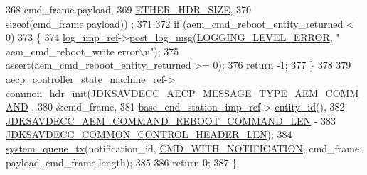 \begin{DoxyCode}
368                                                                                  cmd\_frame.payload,
369                                                                                  
      \hyperlink{namespaceavdecc__lib_a6c827b1a0d973e18119c5e3da518e65ca9512ad9b34302ba7048d88197e0a2dc0}{ETHER\_HDR\_SIZE},
370                                                                                  \textcolor{keyword}{sizeof}(cmd\_frame.payload))
      ;
371 
372     \textcolor{keywordflow}{if} (aem\_cmd\_reboot\_entity\_returned < 0)
373     \{
374         \hyperlink{namespaceavdecc__lib_acbe3e2a96ae6524943ca532c87a28529}{log\_imp\_ref}->\hyperlink{classavdecc__lib_1_1log_a68139a6297697e4ccebf36ccfd02e44a}{post\_log\_msg}(\hyperlink{namespaceavdecc__lib_a501055c431e6872ef46f252ad13f85cdaf2c4481208273451a6f5c7bb9770ec8a}{LOGGING\_LEVEL\_ERROR}, \textcolor{stringliteral}{"
      aem\_cmd\_reboot\_write error\(\backslash\)n"});
375         assert(aem\_cmd\_reboot\_entity\_returned >= 0);
376         \textcolor{keywordflow}{return} -1;
377     \}
378 
379     \hyperlink{namespaceavdecc__lib_a0b1b5aea3c0490f77cbfd9178af5be22}{aecp\_controller\_state\_machine\_ref}->
      \hyperlink{classavdecc__lib_1_1aecp__controller__state__machine_aafc737d7ed17a62fed9df6528f18d3ec}{common\_hdr\_init}(\hyperlink{group__aecp__message__type_ga4625ce189cc209f42deb0629f48faf69}{JDKSAVDECC\_AECP\_MESSAGE\_TYPE\_AEM\_COMMAND}
      ,
380                                                        &cmd\_frame,
381                                                        \hyperlink{classavdecc__lib_1_1descriptor__base__imp_a550c969411f5f3b69f55cc139763d224}{base\_end\_station\_imp\_ref}->
      \hyperlink{classavdecc__lib_1_1end__station__imp_a363b6c9664a0d701def9b17863e20ad3}{entity\_id}(),
382                                                        
      \hyperlink{group__command__reboot_gaf5f6dbe8949b2bb7db6ad9e25e8bddf1}{JDKSAVDECC\_AEM\_COMMAND\_REBOOT\_COMMAND\_LEN} -
383                                                            
      \hyperlink{group__jdksavdecc__avtp__common__control__header_gaae84052886fb1bb42f3bc5f85b741dff}{JDKSAVDECC\_COMMON\_CONTROL\_HEADER\_LEN});
384     \hyperlink{namespaceavdecc__lib_a6dd511685627c0865a3442b539a4e8e9}{system\_queue\_tx}(notification\_id, \hyperlink{namespaceavdecc__lib_aabcadff06aa62be0ce47bc0646823604aba48b8a017e06fb240b650cdea965178}{CMD\_WITH\_NOTIFICATION}, cmd\_frame.
      payload, cmd\_frame.length);
385 
386     \textcolor{keywordflow}{return} 0;
387 \}
\end{DoxyCode}


